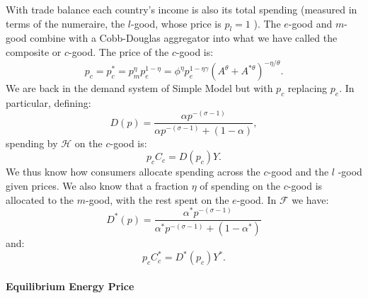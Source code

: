 \documentclass[notitlepage,12pt]{article}
\begin{document}
With trade balance each country's income is also its total spending
(measured in terms of the numeraire, the $l$-good, whose price is $p_{l}=1$%
). The $e$-good and $m$-good combine with a Cobb-Douglas aggregator into
what we have called the composite or $c$-good. The price of the $c$-good is:%
\begin{equation}
p_{c}=p_{c}^{\ast }=p_{m}^{\eta }p_{e}^{1-\eta }=\phi ^{\eta }p_{e}^{1-\eta
\gamma }\left( A^{\theta }+A^{\ast \theta }\right) ^{-\eta /\theta }.
\label{p_c no prod or cons taxes}
\end{equation}%
We are back in the demand system of Simple Model but with $p_{c}$ replacing $%
p_{e}$. In particular, defining:%
\begin{equation}
D(p)=\frac{\alpha p^{-\left( \sigma -1\right) }}{\alpha p^{-(\sigma
-1)}+(1-\alpha )},  \label{c spending share}
\end{equation}%
spending by $\mathcal{H}$ on the $c$-good is:%
\begin{equation*}
p_{c}C_{c}=D(p_{c})Y.
\end{equation*}%
We thus know how consumers allocate spending across the $c$-good and the $l$%
-good given prices. We also know that a fraction $\eta $ of spending on the $%
c$-good is allocated to the $m$-good, with the rest spent on the $e$-good.
In $\mathcal{F}$ we have:%
\begin{equation*}
D^{\ast }(p)=\frac{\alpha ^{\ast }p^{-\left( \sigma -1\right) }}{\alpha
^{\ast }p^{-(\sigma -1)}+(1-\alpha ^{\ast })}
\end{equation*}%
and:%
\begin{equation*}
p_{c}C_{c}^{\ast }=D^{\ast }(p_{c})Y^{\ast }.
\end{equation*}

\paragraph{Equilibrium Energy Price}
\end{document}
